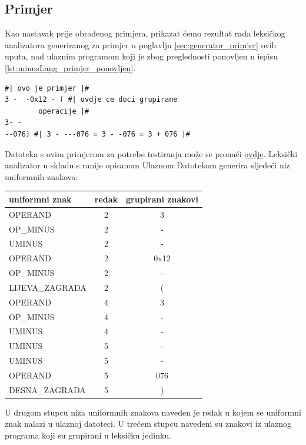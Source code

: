 \documentclass[times, 12pt, utf8]{book}
\begin{document}
\subsection{Primjer}\label{sec:leksicki_analizator_primjer}
Kao nastavak prije obrađenog primjera, prikazat ćemo rezultat rada leksičkog analizatora generiranog za primjer u poglavlju \ref{sec:generator_primjer} ovih uputa, nad ulaznim programom koji je zbog preglednosti ponovljen u ispisu \ref{lst:minusLang_primjer_ponovljen}.

\begin{lstlisting}[caption={Primjer programa pisanog u jeziku \emph{minusLang}.},label=lst:minusLang_primjer_ponovljen]
#| ovo je primjer |#
3 -  -0x12 - ( #| ovdje ce doci grupirane
		operacije |#
3- -
--076) #| 3 - ---076 = 3 - -076 = 3 + 076 |#

\end{lstlisting}

Datoteka s ovim primjerom za potrebe testiranja može se pronaći \href{https://github.com/fer-ppj/ppj-labosi/raw/master/res/lab1/primjer.minus}{ovdje}.
Leksički analizator u skladu s ranije opisanom Ulaznom Datotekom generira sljedeći niz uniformnih znakova:

\begin{table}[ht]
\centering
\begin{tabular}{|l|c|c|}
\hline
uniformni znak&redak&grupirani znakovi\\
\hline
OPERAND&2&3\\
\hline
OP\_MINUS&2&-\\
\hline
UMINUS&2&-\\
\hline
OPERAND&2&0x12\\
\hline
OP\_MINUS&2&-\\
\hline
LIJEVA\_ZAGRADA&2&(\\
\hline
OPERAND&4&3\\
\hline
OP\_MINUS&4&-\\
\hline
UMINUS&4&-\\
\hline
UMINUS&5&-\\
\hline
UMINUS&5&-\\
\hline
OPERAND&5&076\\
\hline
DESNA\_ZAGRADA&5&)\\
\hline
\end{tabular}
\end{table}

U drugom stupcu niza uniformnih znakova naveden je redak u kojem se uniformni znak nalazi u ulaznoj datoteci.
U trećem stupcu navedeni su znakovi iz ulaznog programa koji su grupirani u leksičku jedinku.
\end{document}
